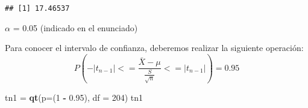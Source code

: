 \documentclass[
]{article}
\newenvironment{Shaded}{\begin{snugshade}}{\end{snugshade}}
\newcommand{\CommentTok}[1]{\textcolor[rgb]{0.56,0.35,0.01}{\textit{#1}}}
\newcommand{\ControlFlowTok}[1]{\textcolor[rgb]{0.13,0.29,0.53}{\textbf{#1}}}
\newcommand{\DataTypeTok}[1]{\textcolor[rgb]{0.13,0.29,0.53}{#1}}
\newcommand{\DecValTok}[1]{\textcolor[rgb]{0.00,0.00,0.81}{#1}}
\newcommand{\FloatTok}[1]{\textcolor[rgb]{0.00,0.00,0.81}{#1}}
\newcommand{\KeywordTok}[1]{\textcolor[rgb]{0.13,0.29,0.53}{\textbf{#1}}}
\newcommand{\NormalTok}[1]{#1}
\newcommand{\OperatorTok}[1]{\textcolor[rgb]{0.81,0.36,0.00}{\textbf{#1}}}
\newcommand{\StringTok}[1]{\textcolor[rgb]{0.31,0.60,0.02}{#1}}
\begin{document}
\begin{Shaded}
\end{Shaded}

\begin{Shaded}
\end{Shaded}

\begin{verbatim}
## [1] 17.46537
\end{verbatim}

\(\alpha\) = 0.05 (indicado en el enunciado)

Para conocer el intervalo de confianza, deberemos realizar la siguiente
operación:
\[ P(-|t_{n-1}| <= \frac{\bar{X} - \mu}{\frac{S}{\sqrt{n}}} <= |t_{n-1}|) = 0.95 \]

\begin{Shaded}
\begin{Highlighting}[]
\NormalTok{tn1 =}\StringTok{ }\KeywordTok{qt}\NormalTok{(}\DataTypeTok{p=}\NormalTok{(}\DecValTok{1} \OperatorTok{-}\StringTok{ }\FloatTok{0.95}\NormalTok{), }\DataTypeTok{df =} \DecValTok{204}\NormalTok{)}
\NormalTok{tn1}
\end{Highlighting}
\end{Shaded}
\end{document}
